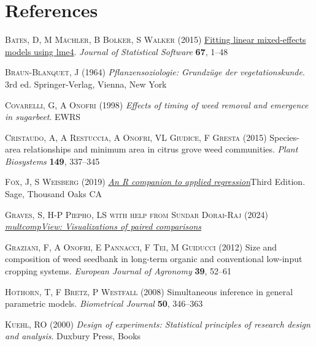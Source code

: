 \documentclass[
  letterpaper,
  DIV=11,
  numbers=noendperiod]{scrreprt}
\newlength{\cslhangindent}
\newenvironment{CSLReferences}[2] %
 {\begin{list}{}{%
  \setlength{\itemindent}{0pt}
  \setlength{\leftmargin}{0pt}
  \setlength{\parsep}{0pt}
  \ifodd #1
   \setlength{\leftmargin}{\cslhangindent}
   \setlength{\itemindent}{-1\cslhangindent}
  \fi
  \setlength{\itemsep}{#2\baselineskip}}}
 {\end{list}}
\begin{document}

\chapter{References}\label{references}

\protect{}\label{refs}
\begin{CSLReferences}{1}{0}
\textsc{Bates, D, M Mächler, B Bolker, S Walker} (2015)
\href{https://doi.org/10.18637/jss.v067.i01}{Fitting linear
mixed-effects models using {lme4}}. \emph{Journal of Statistical
Software} \textbf{67}, 1--48

\textsc{Braun-Blanquet, J} (1964) \emph{Pflanzensoziologie: Grundz{ü}ge
der vegetationskunde}. 3rd ed. Springer-Verlag, Vienna, New York

\textsc{Covarelli, G, A Onofri} (1998) \emph{Effects of timing of weed
removal and emergence in sugarbeet}. EWRS

\textsc{Cristaudo, A, A Restuccia, A Onofri, VL Giudice, F Gresta}
(2015) Species-area relationships and minimum area in citrus grove weed
communities. \emph{Plant Biosystems} \textbf{149}, 337--345

\textsc{Fox, J, S Weisberg} (2019)
\emph{\href{https://www.john-fox.ca/Companion/}{An {R} companion to
applied regression}}Third Edition. Sage, Thousand Oaks {CA}

\textsc{Graves, S, H-P Piepho, LS with help from Sundar Dorai-Raj}
(2024)
\emph{\href{https://CRAN.R-project.org/package=multcompView}{multcompView:
Visualizations of paired comparisons}}

\textsc{Graziani, F, A Onofri, E Pannacci, F Tei, M Guiducci} (2012)
Size and composition of weed seedbank in long-term organic and
conventional low-input cropping systems. \emph{European Journal of
Agronomy} \textbf{39}, 52--61

\textsc{Hothorn, T, F Bretz, P Westfall} (2008) Simultaneous inference
in general parametric models. \emph{Biometrical Journal} \textbf{50},
346--363

\textsc{Kuehl, RO} (2000) \emph{Design of experiments: Statistical
principles of research design and analysis}. Duxbury Press, Books


\end{CSLReferences}
\end{document}
